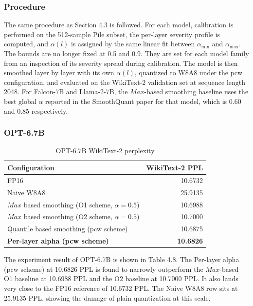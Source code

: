 \subsubsection*{Procedure}
The same procedure as Section 4.3 is followed. For each model, calibration is performed on the 512-sample Pile subset, the per-layer severity profile is computed, and $\alpha(l)$ is assigned by the same linear fit between $\alpha_{\min}$ and $\alpha_{\max}$. The bounds are no longer fixed at 0.5 and 0.9. They are set for each model family from an inspection of its severity spread during calibration. The model is then smoothed layer by layer with its own $\alpha(l)$, quantized to W8A8 under the pcw configuration, and evaluated on the WikiText-2 validation set at sequence length 2048. For Falcon-7B and Llama-2-7B, the $Max$-based smoothing baseline uses the best global $\alpha$ reported in the SmoothQuant paper for that model, which is 0.60 and 0.85 respectively.

\subsubsection*{OPT-6.7B}

\begin{table}[h]
\centering
\begin{threeparttable}
\caption{OPT-6.7B WikiText-2 perplexity}
\begin{tabular}{lr}
\hline
Configuration & WikiText-2 PPL \\
\hline
FP16 & 10.6732 \\
Naive W8A8 & 25.9135 \\
$Max$ based smoothing (O1 scheme, $\alpha=0.5$) & 10.6988 \\
$Max$ based smoothing (O2 scheme, $\alpha=0.5$) & 10.7000 \\
Quantile based smoothing (pcw scheme) & 10.6875 \\
\textbf{Per-layer alpha (pcw scheme)} & \textbf{10.6826} \\
\hline
\end{tabular}
\end{threeparttable}
\end{table}

The experiment result of OPT-6.7B is shown in Table 4.8. The Per-layer alpha (pcw scheme) at 10.6826 PPL is found to narrowly outperform the $Max$-based O1 baseline at 10.6988 PPL and the O2 baseline at 10.7000 PPL. It also lands very close to the FP16 reference of 10.6732 PPL. The Naive W8A8 row sits at 25.9135 PPL, showing the damage of plain quantization at this scale.


